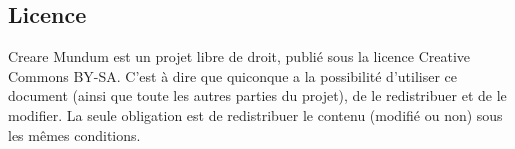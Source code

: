 \documentclass[a4paper, 11pt]{article}
\begin{document}
\subsection{Licence}
Creare Mundum est un projet libre de droit, publié sous la licence Creative Commons BY-SA. C'est à dire que quiconque a la possibilité d'utiliser ce document (ainsi que toute les autres parties du projet), de le redistribuer et de le modifier. La seule obligation est de redistribuer le contenu (modifié ou non) sous les mêmes conditions.
\end{document}
